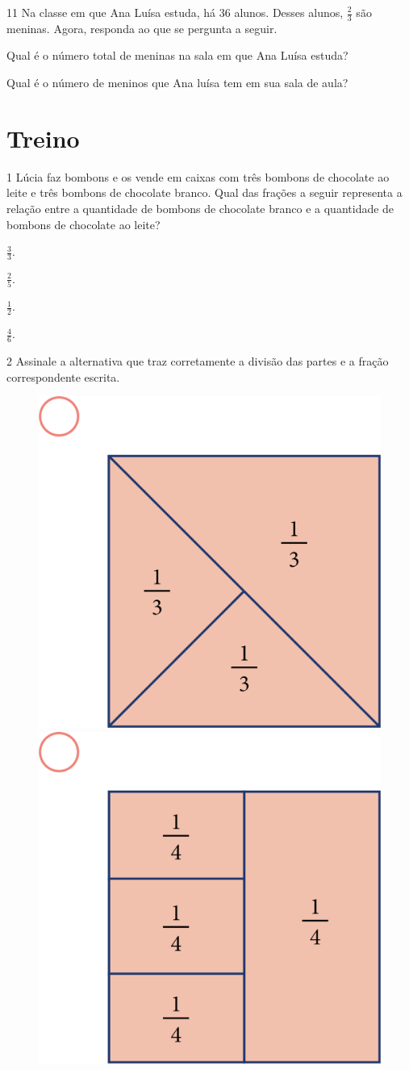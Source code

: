 \num{11} Na classe em que Ana Luísa estuda, há 36 alunos. Desses alunos, $\frac{2}{3}$
são meninas. Agora, responda ao que se pergunta a seguir.

\begin{escolha}
\item
  Qual é o número total de meninas na sala em que Ana Luísa estuda?
\item{}

\item
  Qual é o número de meninos que Ana luísa tem em sua sala de aula?
\item{}
\end{escolha}

\section*{Treino}

\num{1} Lúcia faz bombons e os vende em caixas com três bombons de chocolate ao leite e três bombons de chocolate branco. Qual das frações a seguir representa a relação entre a quantidade de
bombons de chocolate branco e a quantidade de bombons de chocolate ao leite?

\begin{multicols}{2}
\begin{escolha}
\item
  $\frac{3}{3}$.

\item
  $\frac{2}{5}$.

\item
  $\frac{1}{2}$.

\item
  $\frac{4}{6}$.
\end{escolha}
\end{multicols}

\pagebreak
\num{2} Assinale a alternativa que traz corretamente a divisão das partes e a
fração correspondente escrita.

\begin{figure}[htpb!]
\includegraphics[width=.3\textwidth]{media/image66.png}
\includegraphics[width=.3\textwidth]{media/image67.png}
\end{figure}

